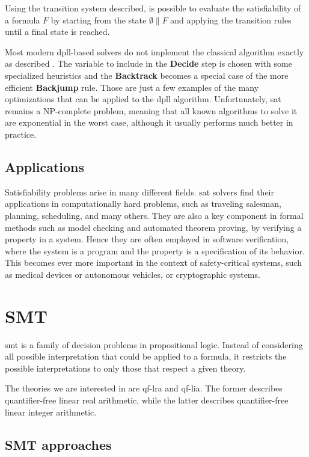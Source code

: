 Using the transition system described, is possible to evaluate the satisfiability of a formula $F$ by starting from the state $\emptyset \parallel F$ and applying the transition rules until a final state is reached.

Most modern \gls{dpll}-based solvers do not implement the classical algorithm exactly as described \cite{paper:dpll(t)}.
The variable to include in the \textbf{Decide} step is chosen with some specialized heuristics and the \textbf{Backtrack} becomes a special case of the more efficient \textbf{Backjump} rule.
Those are just a few examples of the many optimizations that can be applied to the \gls{dpll} algorithm.
Unfortunately, \gls{sat} remains a NP-complete problem, meaning that all known algorithms to solve it are exponential in the worst case, although it usually performs much better in practice.

\subsection*{Applications}

Satisfiability problems arise in many different fields.
\gls{sat} solvers find their applications in computationally hard problems, such as traveling salesman, planning, scheduling, and many others.
They are also a key component in formal methods such as model checking and automated theorem proving, by verifying a property in a system.
Hence they are often employed in software verification, where the system is a program and the property is a specification of its behavior.
This becomes ever more important in the context of safety-critical systems, such as medical devices or autonomous vehicles, or cryptographic systems.

\section{SMT}

\gls{smt} is a family of decision problems in propositional logic.
Instead of considering all possible interpretation that could be applied to a formula, it restricts the possible interpretations to only those that respect a given theory.

The theories we are interested in are \gls{qf-lra} and \gls{qf-lia}.
The former describes quantifier-free linear real arithmetic, while the latter describes quantifier-free linear integer arithmetic.

\subsection*{SMT approaches}

